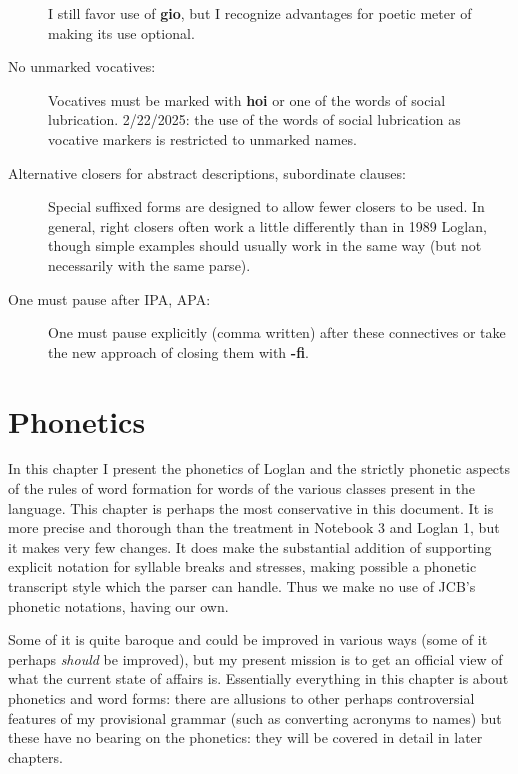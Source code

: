 \documentclass[12pt]{book}
\begin{document}
\begin{description}
I still favor use of {\bf gio}, but I recognize advantages for poetic meter of making its use optional.



\item[No unmarked vocatives:]  Vocatives must be marked with {\bf hoi} or one of the words of social lubrication.  2/22/2025:  the use of the words of social lubrication as vocative markers is restricted to unmarked names.

\item[Alternative closers for abstract descriptions, subordinate clauses:]  Special suffixed forms are designed to allow fewer closers to be used.  In general, right closers often work a little differently than in 1989 Loglan, though simple examples should usually work in the same way (but not necessarily with the same parse).

\item[One must pause after IPA, APA:]  One must pause explicitly (comma written) after these connectives or take the new approach of closing them with {\bf -fi}.

\end{description}

\chapter{Phonetics}

In this chapter I present the phonetics of Loglan and the strictly phonetic aspects of the rules of word formation for words of the various classes present in the language.  This chapter is perhaps the  most conservative in this document.  It is more precise and thorough than the treatment in Notebook 3 and Loglan 1, but it makes very few changes.  It does make the substantial addition of supporting explicit notation for syllable breaks and stresses, making possible a phonetic transcript style which the parser can handle.  Thus we make no use of JCB's phonetic notations, having our own.

 Some of it is quite baroque and could be improved in various ways (some of it perhaps {\em should\/} be improved), but my present mission is to get an official view of what the current state of affairs is.   Essentially everything in this chapter  is about phonetics and word forms:  there are allusions to other perhaps controversial features of my provisional grammar (such as converting acronyms to names) but these have no bearing on the phonetics:  they will be covered in detail in later chapters.
\end{document}

